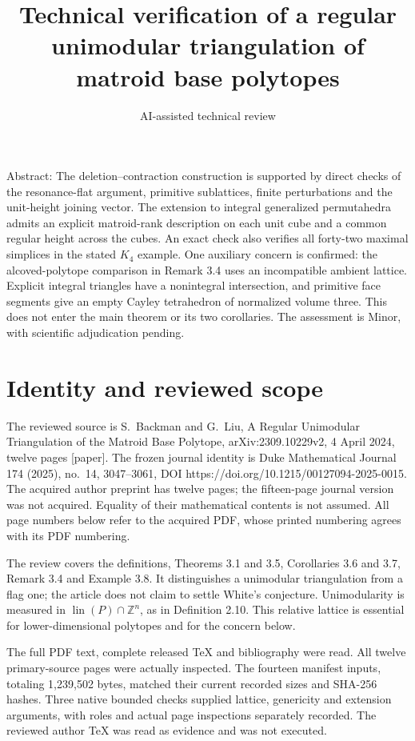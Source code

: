 \documentclass[10pt]{article}
\title{Technical verification of a regular unimodular
triangulation of matroid base polytopes}
\author{AI-assisted technical review}
\date{}
\begin{document}
\maketitle
Abstract: The deletion–contraction construction is supported by direct checks of the resonance-flat argument, primitive sublattices, finite perturbations and the unit-height joining vector. The extension to integral generalized permutahedra admits an explicit matroid-rank description on each unit cube and a common regular height across the cubes. An exact check also verifies all forty-two maximal simplices in the stated \(K_4\) example. One auxiliary concern is confirmed: the alcoved-polytope comparison in Remark 3.4 uses an incompatible ambient lattice. Explicit integral triangles have a nonintegral intersection, and primitive face segments give an empty Cayley tetrahedron of normalized volume three. This does not enter the main theorem or its two corollaries. The assessment is Minor, with scientific adjudication pending.\par
\section*{Identity and reviewed scope}
The reviewed source is S. Backman and G. Liu, A Regular Unimodular Triangulation of the Matroid Base Polytope, arXiv:2309.10229v2, 4 April 2024, twelve pages [paper]. The frozen journal identity is Duke Mathematical Journal 174 (2025), no. 14, 3047–3061, DOI https://doi.org/10.1215/00127094-2025-0015. The acquired author preprint has twelve pages; the fifteen-page journal version was not acquired. Equality of their mathematical contents is not assumed. All page numbers below refer to the acquired PDF, whose printed numbering agrees with its PDF numbering.\par
The review covers the definitions, Theorems 3.1 and 3.5, Corollaries 3.6 and 3.7, Remark 3.4 and Example 3.8. It distinguishes a unimodular triangulation from a flag one; the article does not claim to settle White’s conjecture. Unimodularity is measured in \(\operatorname{lin}(P)\cap\mathbb Z^n\), as in Definition 2.10. This relative lattice is essential for lower-dimensional polytopes and for the concern below.\par
The full PDF text, complete released TeX and bibliography were read. All twelve primary-source pages were actually inspected. The fourteen manifest inputs, totaling 1,239,502 bytes, matched their current recorded sizes and SHA-256 hashes. Three native bounded checks supplied lattice, genericity and extension arguments, with roles and actual page inspections separately recorded. The reviewed author TeX was read as evidence and was not executed.\par
\end{document}
